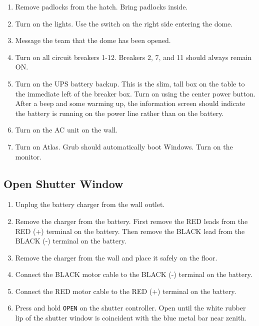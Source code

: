 \documentclass{article}
\begin{document}
			\begin{enumerate}
		
				\item Remove padlocks from the hatch. Bring padlocks inside.
		
				\item Turn on the lights. Use the switch on the right side entering the dome.
			
				\item Message the team that the dome has been opened.
	
				\item Turn on all circuit breakers 1-12. Breakers 2, 7, and 11 should always remain ON.
				
				\item Turn on the UPS battery backup. This is the slim, tall box on the table to the immediate left of the breaker box. Turn on using the center power button. After a beep and some warming up, the information screen should indicate the battery is running on the power line rather than on the battery.
		
				\item Turn on the AC unit on the wall.
	
				\item Turn on Atlas. Grub should automatically boot Windows. Turn on the monitor.
		
			\end{enumerate}
		
		\subsection{Open Shutter Window}
		
			\begin{enumerate}

				\item Unplug the battery charger from the wall outlet.
				
				\item Remove the charger from the battery. First remove the RED leads from the RED (+) terminal on the battery. Then remove the BLACK lead from the BLACK (-) terminal on the battery.
			
				\item Remove the charger from the wall and place it safely on the floor.
	
				\item Connect the BLACK motor cable to the BLACK (-) terminal on the battery.
			
				\item Connect the RED motor cable to the RED (+) terminal on the battery.
			
				\item Press and hold \texttt{OPEN} on the shutter controller. Open until the white rubber lip of the shutter window is coincident with the blue metal bar near zenith.
				
			\end{enumerate}
		
\end{document}

